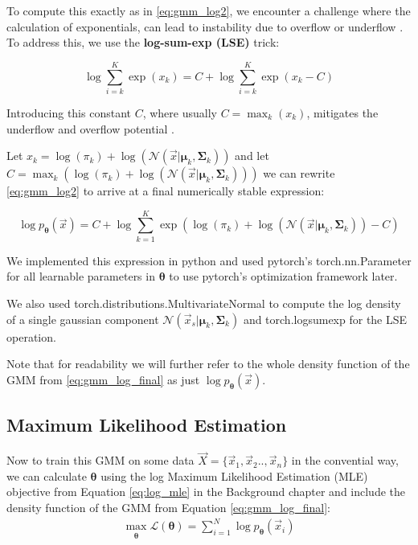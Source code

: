 To compute this exactly as in \ref{eq:gmm_log2}, we encounter a challenge where the calculation of exponentials, can lead to instability due to overflow or underflow \cite{logsumexp}. \\
To address this, we use the \textbf{log-sum-exp (LSE)} trick:

\[
    \log \sum_{i=k}^K \exp(x_k) = C + \log \sum_{i=k}^K \exp(x_k - C)
\]

Introducing this constant $C$, where usually $C = \max_k (x_k)$, mitigates the underflow and overflow potential \cite{logsumexp}.

Let $x_k = \log(\pi_k) + \log \left(\mathcal{N}(\vec x | \boldsymbol{\mu}_k, \boldsymbol{\Sigma}_k)\right)$ and 
let $C = \max_k \left( \log(\pi_k) + \log \left( \mathcal{N}(\vec x | \boldsymbol{\mu}_k, \boldsymbol{\Sigma}_k) \right) \right) $ we can rewrite 
\ref{eq:gmm_log2} to arrive at a final numerically stable expression: 

\begin{equation}
    \log p_{\boldsymbol{\theta}}(\vec x) = C + \log \sum_{k=1}^K \exp\left( \log(\pi_k) + \log \left( \mathcal{N}(\vec x | \boldsymbol{\mu}_k, \boldsymbol{\Sigma}_k) \right) - C \right)
    \label{eq:gmm_log_final}
\end{equation}

We implemented this expression in python and used pytorch's \cite{pytorch} torch.nn.Parameter 
for all learnable parameters in $\boldsymbol{\theta}$ to use pytorch's optimization framework later.

We also used torch.distributions.MultivariateNormal to compute the log density of a single 
gaussian component $\mathcal{N}(\vec x_s|\boldsymbol{\mu}_k, \boldsymbol{\Sigma}_k)$ and torch.logsumexp
for the LSE operation.  

Note that for readability we will further refer to the whole density function of the GMM from \ref{eq:gmm_log_final} as just 
$\log p_{\boldsymbol{\theta}}(\vec x)$.

\subsection{Maximum Likelihood Estimation}
\label{sec:gmm_mle}

Now to train this GMM on some data $\vec X = \{\vec x_1,\vec  x_2 .. , \vec x_n\}$ in the convential way, we can calculate $\boldsymbol{\theta}$ using the 
log Maximum Likelihood Estimation (MLE) objective from Equation \ref{eq:log_mle} in the Background chapter and include the density function
of the GMM from Equation \ref{eq:gmm_log_final}:
\begin{align}
    \max_{\substack{\boldsymbol{\theta}}} \mathcal{L}(\boldsymbol{\theta}) = \sum_{i=1}^{N} \log p_{\boldsymbol{\theta}}(\vec x_i)
    \label{eq:gmm_objective}
\end{align}

